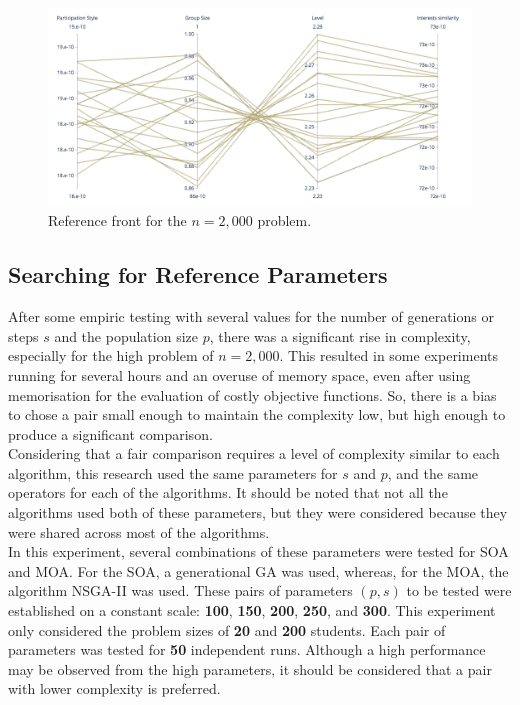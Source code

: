 \begin{figure}[H]
    \centering
    \includegraphics[width=\textwidth]{images/parallel_ref_2000.png}
    \caption{Reference front for the $n=2,000$ problem. }
    \label{fig:reference_front_2000}
\end{figure}

\subsection{Searching for Reference Parameters}

After some empiric testing with several values for the number of generations or steps $s$ and the population size $p$, there was a significant rise in complexity, especially for the high problem of $n=2,000$. This resulted in some experiments running for several hours and an overuse of memory space, even after using memorisation for the evaluation of costly objective functions. So, there is a bias to chose a pair small enough to maintain the complexity low, but high enough to produce a significant comparison.\\

Considering that a fair comparison requires a level of complexity similar to each algorithm, this research used the same parameters for $s$ and $p$, and the same operators for each of the algorithms. It should be noted that not all the algorithms used both of these parameters, but they were considered because they were shared across most of the algorithms.\\

In this experiment, several combinations of these parameters were tested for SOA and MOA. For the SOA, a generational GA was used, whereas, for the MOA, the algorithm NSGA-II was used. These pairs of parameters $(p,s)$ to be tested were established on a constant scale: \textbf{100}, \textbf{150}, \textbf{200}, \textbf{250}, and \textbf{300}. This experiment only considered the problem sizes of \textbf{20} and \textbf{200} students. Each pair of parameters was tested for \textbf{50} independent runs. Although a high performance may be observed from the high parameters, it should be considered that a pair with lower complexity is preferred.\\

